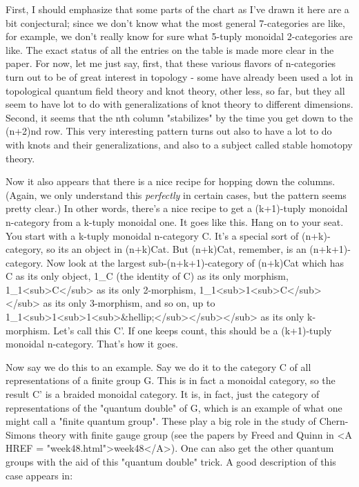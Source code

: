 First, I should emphasize that some parts of the chart as I've
drawn it here are a bit conjectural; since we don't know what
the most general 7-categories are like, for example, we don't
really know for sure what 5-tuply monoidal 2-categories are like.
The exact status of all the entries on the table is made more
clear in the paper.  For now, let me just say, first, that these
various flavors of n-categories turn out to be of great interest
in topology - some have already been used a lot in topological
quantum field theory and knot theory, other less, so far, but they
all seem to have lot to do with generalizations of knot theory to
different dimensions.  Second, it seems that the nth column "stabilizes"
by the time you get down to the (n+2)nd row.  This very interesting
pattern turns out also to have a lot to do with knots and their
generalizations, and also to a subject called stable homotopy theory.

Now it also appears that there is a nice recipe for hopping down the 
columns.   (Again, we only understand this \emph{perfectly} in certain
cases, but the pattern seems pretty clear.)  In other words, there's
a nice recipe to get a (k+1)-tuply monoidal n-category from a
k-tuply monoidal one.  It goes like this.  Hang on to your seat.
You start with a k-tuply monoidal n-category C.  It's a special
sort of (n+k)-category, so its an object in (n+k)Cat.  But
(n+k)Cat, remember, is an (n+k+1)-category.  Now look at the
largest sub-(n+k+1)-category of (n+k)Cat which has C as its
only object, 1_{C} (the identity of C) as its only morphism,
1_{1<sub>C}</sub> 
as its only 2-morphism, 1_{1<sub>1<sub>C}</sub></sub> 
as its only 3-morphism,
and so on, up to 1_{1<sub>1<sub>1<sub>&hellip;}</sub></sub></sub>
as its only k-morphism.  Let's call
this C'.  If one keeps count, this should be a (k+1)-tuply monoidal 
n-category.   That's how it goes. 

Now say we do this to an example.  Say we do it to the category C
of all representations of a finite group G.  This is in fact a monoidal
category, so the result C' is a braided monoidal category.  It is,
in fact, just the category of representations of the "quantum double"
of G, which is an example of what one might call a "finite quantum
group".  These play a big role in the study of Chern-Simons theory
with finite gauge group (see the papers by Freed and Quinn in <A HREF = "week48.html">week48</A>).  
One can also get the other quantum groups with the aid of this
"quantum double" trick.  A good description of this case appears
in:


